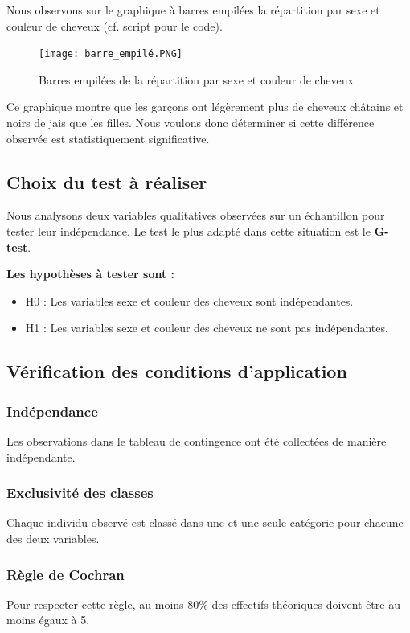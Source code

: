 \documentclass[12pt,a4paper]{article}
\begin{document}
	Nous observons sur le graphique à barres empilées la répartition par sexe et couleur de cheveux (cf. script pour le code).
	
	\begin{figure}[H]
		\centering
		\texttt{[image: barre\_empilé.PNG]}
		\caption{Barres empilées de la répartition par sexe et couleur de cheveux}
		\label{fig:barre_empile}
	\end{figure}
	
	Ce graphique montre que les garçons ont légèrement plus de cheveux châtains et noirs de jais que les filles. Nous voulons donc déterminer si cette différence observée est statistiquement significative.

	\subsection{Choix du test à réaliser}
	Nous analysons deux variables qualitatives observées sur un échantillon pour tester leur indépendance. Le test le plus adapté dans cette situation est le \textbf{G-test}.
	
	\textbf{Les hypothèses à tester sont :}
	\begin{itemize}
		\item H0 : Les variables sexe et couleur des cheveux sont indépendantes.
		\item H1 : Les variables sexe et couleur des cheveux ne sont pas indépendantes.
	\end{itemize}
	
	\subsection{Vérification des conditions d'application}
	\subsubsection{Indépendance}
	Les observations dans le tableau de contingence ont été collectées de manière indépendante.
	\subsubsection{Exclusivité des classes}
	Chaque individu observé est classé dans une et une seule catégorie pour chacune des deux variables.
	\subsubsection{Règle de Cochran}
	Pour respecter cette règle, au moins 80\% des effectifs théoriques doivent être au moins égaux à 5.
	
\end{document}
